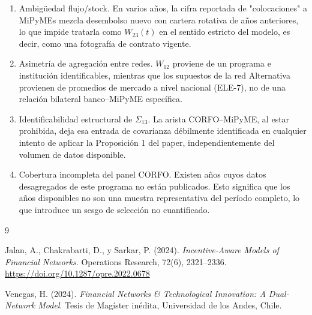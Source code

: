 \documentclass[11pt]{article}
\begin{document}
\begin{enumerate}
    \item Ambigüedad flujo/stock. En varios años, la cifra reportada de "colocaciones" a MiPyMEs mezcla desembolso nuevo con cartera rotativa de años anteriores, lo que impide tratarla como $W_{23}(t)$ en el sentido estricto del modelo, es decir, como una fotografía de contrato vigente.
    \item Asimetría de agregación entre redes. $W_{12}$ proviene de un programa e institución identificables, mientras que los supuestos de la red Alternativa provienen de promedios de mercado a nivel nacional (ELE-7), no de una relación bilateral banco--MiPyME específica.
    \item Identificabilidad estructural de $\Sigma_{13}$. La arista CORFO--MiPyME, al estar prohibida, deja esa entrada de covarianza débilmente identificada en cualquier intento de aplicar la Proposición 1 del paper, independientemente del volumen de datos disponible.
    \item Cobertura incompleta del panel CORFO. Existen años cuyos datos desagregados de este programa no están publicados. Esto significa que los años disponibles no son una muestra representativa del período completo, lo que introduce un sesgo de selección no cuantificado.
\end{enumerate}


\begin{thebibliography}{9}

Jalan, A., Chakrabarti, D., y Sarkar, P. (2024).
\textit{Incentive-Aware Models of Financial Networks}.
Operations Research, 72(6), 2321--2336.
\url{https://doi.org/10.1287/opre.2022.0678}

Venegas, H. (2024).
\textit{Financial Networks \& Technological Innovation: A Dual-Network Model}.
Tesis de Magíster inédita, Universidad de los Andes, Chile.

\end{thebibliography}
\end{document}

